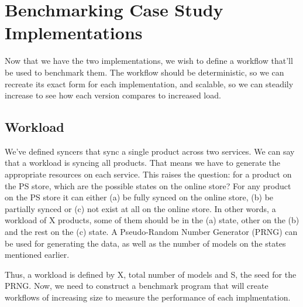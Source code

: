 \chapter{Benchmarking Case Study Implementations}
Now that we have the two implementations, we wish to define a workflow that'll be used to benchmark them. The workflow should be deterministic, so we can recreate its exact form for each implementation, and scalable, so we can steadily increase to see how each version compares to increased load.
\section{Workload}
We've defined syncers that sync a single product across two services. We can say that a workload is syncing all products. That means we have to generate the appropriate resources on each service. This raises the question: for a product on the PS store, which are the possible states on the online store? For any product on the PS store it can either (a) be fully synced on the online store, (b) be partially synced or (c) not exist at all on the online store. In other words, a workload of X products, some of them should be in the (a) state, other on the (b) and the rest on the (c) state. A Pseudo-Random Number Generator (PRNG) can be used for generating the data, as well as the number of models on the states mentioned earlier.

Thus, a workload is defined by X, total number of models and S, the seed for the PRNG.
Now, we need to construct a benchmark program that will create workflows of increasing size to measure the performance of each implmentation.
